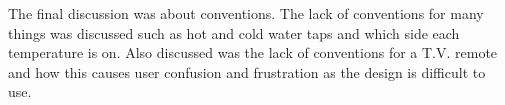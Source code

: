 \documentclass{article}
\begin{document}
The final discussion was about conventions. The lack of conventions for many things was discussed
such as hot and cold water taps and which side each temperature is on. Also discussed was the lack
of conventions for a T.V. remote and how this causes user confusion and frustration as the design
is difficult to use.
\end{document}
